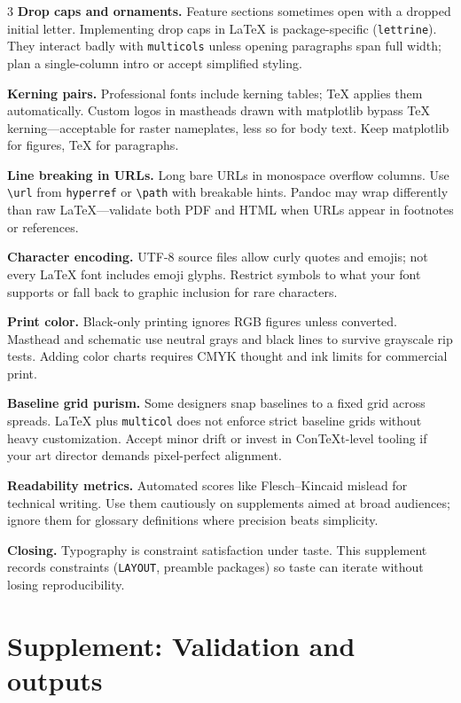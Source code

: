 \documentclass[
]{article}
\begin{document}
\begin{multicols}{3}
\textbf{Drop caps and ornaments.} Feature sections sometimes open with a
dropped initial letter. Implementing drop caps in LaTeX is
package-specific (\texttt{lettrine}). They interact badly with
\texttt{multicols} unless opening paragraphs span full width; plan a
single-column intro or accept simplified styling.

\textbf{Kerning pairs.} Professional fonts include kerning tables; TeX
applies them automatically. Custom logos in mastheads drawn with
matplotlib bypass TeX kerning---acceptable for raster nameplates, less
so for body text. Keep matplotlib for figures, TeX for paragraphs.

\textbf{Line breaking in URLs.} Long bare URLs in monospace overflow
columns. Use \texttt{\textbackslash{}url} from \texttt{hyperref} or
\texttt{\textbackslash{}path} with breakable hints. Pandoc may wrap
differently than raw LaTeX---validate both PDF and HTML when URLs appear
in footnotes or references.

\textbf{Character encoding.} UTF-8 source files allow curly quotes and
emojis; not every LaTeX font includes emoji glyphs. Restrict symbols to
what your font supports or fall back to graphic inclusion for rare
characters.

\textbf{Print color.} Black-only printing ignores RGB figures unless
converted. Masthead and schematic use neutral grays and black lines to
survive grayscale rip tests. Adding color charts requires CMYK thought
and ink limits for commercial print.

\textbf{Baseline grid purism.} Some designers snap baselines to a fixed
grid across spreads. LaTeX plus \texttt{multicol} does not enforce
strict baseline grids without heavy customization. Accept minor drift or
invest in ConTeXt-level tooling if your art director demands
pixel-perfect alignment.

\textbf{Readability metrics.} Automated scores like Flesch--Kincaid
mislead for technical writing. Use them cautiously on supplements aimed
at broad audiences; ignore them for glossary definitions where precision
beats simplicity.

\textbf{Closing.} Typography is constraint satisfaction under taste.
This supplement records constraints (\texttt{LAYOUT}, preamble packages)
so taste can iterate without losing reproducibility.

\end{multicols}

\newpage

\section{Supplement: Validation and
outputs}\label{supplement-validation-and-outputs}
\end{document}
